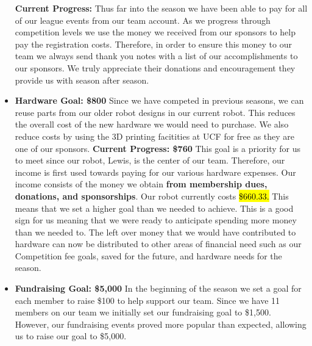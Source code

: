 \begin{itemize}
  
  \textbf{Current Progress: }
  Thus far into the season we have been able to pay for all of our league events from our team account. As we progress through competition levels we use the money we received from our sponsors to help pay the registration costs. Therefore, in order to ensure this money to our team we always send thank you notes with a list of our accomplishments to our sponsors. We truly appreciate their donations and encouragement they provide us with season after season. 
  \item \textbf{\Large Hardware Goal: \$800 }
  \newline 
  Since we have competed in previous seasons, we can reuse parts from our older robot designs in our current robot. This reduces the overall cost of the new hardware we would need to purchase. We also reduce costs by using the 3D printing facitities at UCF for free as they are one of our sponsors.
  \newline
  \textbf{Current Progress: \$760}
  This goal is a priority for us to meet since our robot, Lewis, is the center of our team. Therefore, our income is first used towards paying for our various hardware expenses. Our income consists of the money we obtain \textbf{from membership dues, donations, and sponsorships}. Our robot currently costs \hl{\$660.33.} This means that we set a higher goal than we needed to achieve. This is a good sign for us meaning that we were ready to anticipate spending more money than we needed to. The left over money that we would have contributed to hardware can now be distributed to other areas of financial need such as our Competition fee goals, saved for the future, and hardware needs for the season.
  \item \textbf{\Large Fundraising Goal: \$5,000 }
  \newline 
In the beginning of the season we set a goal for each member to raise \$100 to help support our team. Since we have 11 members on our team we initially set our fundraising goal to \$1,500. However, our fundraising events proved more popular than expected, allowing us to raise our goal to \$5,000.

\end{itemize}
